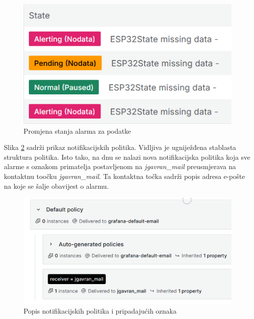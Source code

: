 \begin{figure}[ht]
	\centering
	\includegraphics[scale=0.6]{imgs/alert_rule_esp32state_states}
	\caption{Promjena stanja alarma za podatke}
	\label{fig:alert_rule_esp32state_states}
\end{figure}

Slika \ref{fig:notif_policy} sadrži prikaz notifikacijskih politika. Vidljiva je ugniježđena stablasta struktura politika. Isto tako, na dnu se nalazi nova notifikacijska politika koja sve alarme s oznakom primatelja postavljenom na \textit{jgavran\_mail} preusmjerava na kontaktnu toočku \textit{jgavran\_mail}. Ta kontaktna točka sadrži popis adresa e-pošte na koje se šalje obavijest o alarmu. 

\begin{figure}[ht]
	\centering
	\includegraphics[scale=0.6]{imgs/notif_policy}
	\caption{Popis notifikacijskih politika i pripadajućih oznaka}
	\label{fig:notif_policy}
\end{figure}

